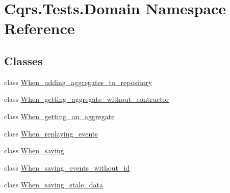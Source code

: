 \hypertarget{namespaceCqrs_1_1Tests_1_1Domain}{}\section{Cqrs.\+Tests.\+Domain Namespace Reference}
\label{namespaceCqrs_1_1Tests_1_1Domain}
\subsection*{Classes}
\begin{DoxyCompactItemize}
\item 
class \hyperlink{classCqrs_1_1Tests_1_1Domain_1_1When__adding__aggregates__to__repository}{When\+\_\+adding\+\_\+aggregates\+\_\+to\+\_\+repository}
\item 
class \hyperlink{classCqrs_1_1Tests_1_1Domain_1_1When__getting__aggregate__without__contructor}{When\+\_\+getting\+\_\+aggregate\+\_\+without\+\_\+contructor}
\item 
class \hyperlink{classCqrs_1_1Tests_1_1Domain_1_1When__getting__an__aggregate}{When\+\_\+getting\+\_\+an\+\_\+aggregate}
\item 
class \hyperlink{classCqrs_1_1Tests_1_1Domain_1_1When__replaying__events}{When\+\_\+replaying\+\_\+events}
\item 
class \hyperlink{classCqrs_1_1Tests_1_1Domain_1_1When__saving}{When\+\_\+saving}
\item 
class \hyperlink{classCqrs_1_1Tests_1_1Domain_1_1When__saving__events__without__id}{When\+\_\+saving\+\_\+events\+\_\+without\+\_\+id}
\item 
class \hyperlink{classCqrs_1_1Tests_1_1Domain_1_1When__saving__stale__data}{When\+\_\+saving\+\_\+stale\+\_\+data}
\end{DoxyCompactItemize}
